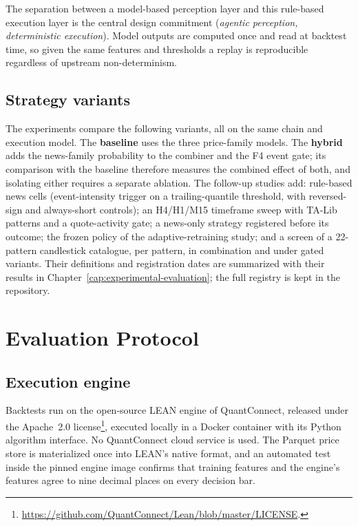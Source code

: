 The separation between a model-based perception layer and this rule-based execution layer is the central design commitment (\emph{agentic perception, deterministic execution}). Model outputs are computed once and read at backtest time, so given the same features and thresholds a replay is reproducible regardless of upstream non-determinism.

\subsection{Strategy variants} \label{subsec:strategy-variants}

The experiments compare the following variants, all on the same chain and execution model. The \textbf{baseline} uses the three price-family models. The \textbf{hybrid} adds the news-family probability to the combiner and the F4 event gate; its comparison with the baseline therefore measures the combined effect of both, and isolating either requires a separate ablation. The follow-up studies add: rule-based news cells (event-intensity trigger on a trailing-quantile threshold, with reversed-sign and always-short controls); an H4/H1/M15 timeframe sweep with TA-Lib patterns and a quote-activity gate; a news-only strategy registered before its outcome; the frozen policy of the adaptive-retraining study; and a screen of a 22-pattern candlestick catalogue, per pattern, in combination and under gated variants. Their definitions and registration dates are summarized with their results in Chapter~\ref{cap:experimental-evaluation}; the full registry is kept in the repository.

\section{Evaluation Protocol} \label{sec:evaluation}

\subsection{Execution engine} \label{sec:execution-engine}

Backtests run on the open-source LEAN engine of QuantConnect, released under the Apache~2.0 license\footnote{\url{https://github.com/QuantConnect/Lean/blob/master/LICENSE}.}, executed locally in a Docker container with its Python algorithm interface. No QuantConnect cloud service is used. The Parquet price store is materialized once into LEAN's native format, and an automated test inside the pinned engine image confirms that training features and the engine's features agree to nine decimal places on every decision bar.

